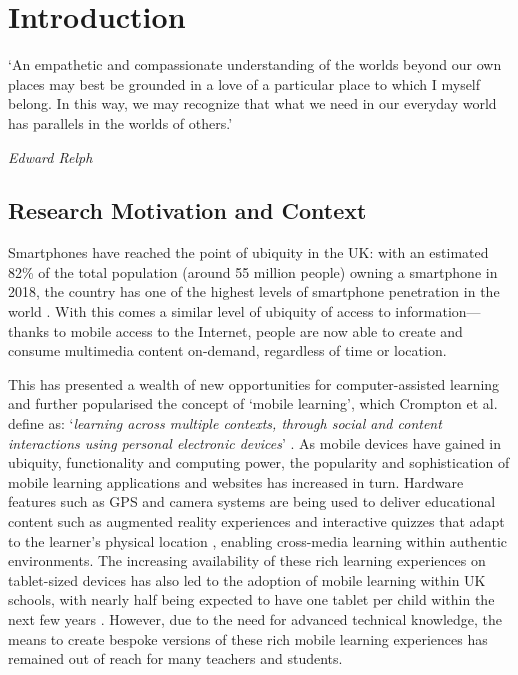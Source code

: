 \chapter{Introduction}

\epigraph{`An empathetic and compassionate understanding of the worlds beyond our own places may best be grounded in a love of a particular place to which I myself belong. In this way, we may recognize that what we need in our everyday world has parallels in the worlds of others.'}{\textit{Edward Relph}}

\section{Research Motivation and Context}
Smartphones have reached the point of ubiquity in the UK: with an estimated 82\% of the total population (around 55 million people) owning a smartphone in 2018, the country has one of the highest levels of smartphone penetration in the world \citep{wikipedia2020}. With this comes a similar level of ubiquity of access to information---thanks to mobile access to the Internet, people are now able to create and consume multimedia content on-demand, regardless of time or location.

This has presented a wealth of new opportunities for computer-assisted learning and further popularised the concept of `mobile learning', which Crompton et al. define as: `\textit{learning across multiple contexts, through social and content interactions using personal electronic devices}' \citep{Crompton2013}. As mobile devices have gained in ubiquity, functionality and computing power, the popularity and sophistication of mobile learning applications and websites has increased in turn. Hardware features such as GPS and camera systems are being used to deliver educational content such as augmented reality experiences \citep{google2020} and interactive quizzes that adapt to the learner's physical location \citep{Giemza2013}, enabling cross-media learning within authentic environments. The increasing availability of these rich learning experiences on tablet-sized devices has also led to the adoption of mobile learning within UK schools, with nearly half being expected to have one tablet per child within the next few years \citep{BritishEducationalSuppliersAssociation2015}. However, due to the need for advanced technical knowledge, the means to create bespoke versions of these rich mobile learning experiences has remained out of reach for many teachers and students.

